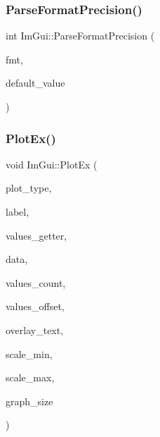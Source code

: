 \hypertarget{namespace_im_gui_a40943047a2f8cad978fabffcbd26805f}{}\label{namespace_im_gui_a40943047a2f8cad978fabffcbd26805f} 
\subsubsection{\texorpdfstring{Parse\+Format\+Precision()}{ParseFormatPrecision()}}
{\footnotesize\ttfamily int Im\+Gui\+::\+Parse\+Format\+Precision (\begin{DoxyParamCaption}\item[{const char $\ast$}]{fmt,  }\item[{int}]{default\+\_\+value }\end{DoxyParamCaption})}

\hypertarget{namespace_im_gui_a0a18ae07b294d5667f95a5c003d2efb6}{}\label{namespace_im_gui_a0a18ae07b294d5667f95a5c003d2efb6} 
\subsubsection{\texorpdfstring{Plot\+Ex()}{PlotEx()}}
{\footnotesize\ttfamily void Im\+Gui\+::\+Plot\+Ex (\begin{DoxyParamCaption}\item[{Im\+Gui\+Plot\+Type}]{plot\+\_\+type,  }\item[{const char $\ast$}]{label,  }\item[{float($\ast$)(void $\ast$data, int idx)}]{values\+\_\+getter,  }\item[{void $\ast$}]{data,  }\item[{int}]{values\+\_\+count,  }\item[{int}]{values\+\_\+offset,  }\item[{const char $\ast$}]{overlay\+\_\+text,  }\item[{float}]{scale\+\_\+min,  }\item[{float}]{scale\+\_\+max,  }\item[{\hyperlink{struct_im_vec2}{Im\+Vec2}}]{graph\+\_\+size }\end{DoxyParamCaption})}

\hypertarget{namespace_im_gui_af7a92b2118981835b5251bfdaac50252}{}\label{namespace_im_gui_af7a92b2118981835b5251bfdaac50252} 
